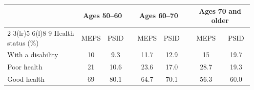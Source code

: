\begin{tabular}{@{}l cc c cc c cc@{}}
\toprule
 & \multicolumn{2}{c}{Ages 50--60} && \multicolumn{2}{c}{Ages 60--70} && \multicolumn{2}{c}{Ages 70 and older} \\
\cmidrule(lr){2-3}\cmidrule(lr){5-6}\cmidrule(l){8-9}
Health status (\%) & MEPS & PSID && MEPS & PSID && MEPS & PSID \\
\midrule
With a disability & 10 & 9.3 && 11.7 & 12.9 && 15 & 19.7 \\
Poor health & 21 & 10.6 && 23.6 & 17.0 && 28.7 & 19.3 \\
Good health & 69 & 80.1 && 64.7 & 70.1 && 56.3 & 60.0 \\
\bottomrule
\end{tabular}
